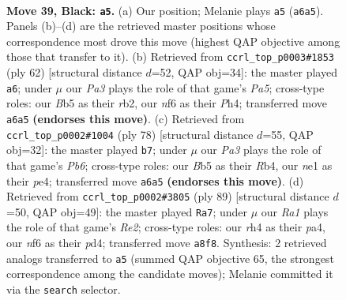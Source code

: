 \documentclass[11pt]{article}
\begin{document}
\clearpage

\begin{figure}[p]\centering
\begin{subfigure}{0.46\textwidth}\centering
\resizebox{\linewidth}{!}{%
\newchessgame
\chessboard[
  setfen={r7/1kP2B2/p4N2/1b3p2/7R/4r3/1P4P1/R2KN3 b - - 1 39},
  showmover=false,
  pgfstyle=straightmove, color=movearrow, markmove={a6-a5}
]}
\caption{}
\end{subfigure}\hfill
\begin{subfigure}{0.46\textwidth}\centering
\resizebox{\linewidth}{!}{%
\newchessgame
\chessboard[
  setfen={r5k1/2B2p2/5R2/P3p1Pp/4b2P/8/1r6/R3K3 w Q - 0 32},
  showmover=false,
  pgfstyle=straightmove, color=movearrow, markmove={a5-a6}
]}
\caption{}
\end{subfigure}
\\[4pt]
\begin{subfigure}{0.46\textwidth}\centering
\resizebox{\linewidth}{!}{%
\newchessgame
\chessboard[
  setfen={1r6/2N5/1P6/r3pp2/PR2pn1k/4R3/5P2/5K2 w - - 0 40},
  showmover=false,
  pgfstyle=straightmove, color=movearrow, markmove={b6-b7}
]}
\caption{}
\end{subfigure}\hfill
\begin{subfigure}{0.46\textwidth}\centering
\resizebox{\linewidth}{!}{%
\newchessgame
\chessboard[
  setfen={3r1k2/4rp1p/1p1Nb3/4P3/P2P4/2R5/5RK1/8 b - - 0 45},
  showmover=false,
  pgfstyle=straightmove, color=movearrow, markmove={e7-a7}
]}
\caption{}
\end{subfigure}
\caption{\textbf{Move 39, Black: \texttt{a5}.} (a) Our position; Melanie plays \texttt{a5} (\texttt{a6a5}). Panels (b)--(d) are the retrieved master positions whose correspondence most drove this move (highest QAP objective among those that transfer to it). (b) Retrieved from \texttt{ccrl\_top\_p0003\#1853} (ply 62) [structural distance $d$=52, QAP obj=34]: the master played \texttt{a6}; under $\mu$ our \emph{Pa3} plays the role of that game's \emph{Pa5}; cross-type roles: our \emph{B}b5 as their \emph{r}b2, our \emph{n}f6 as their \emph{P}h4; transferred move \texttt{a6a5} \textbf{(endorses this move)}. (c) Retrieved from \texttt{ccrl\_top\_p0002\#1004} (ply 78) [structural distance $d$=55, QAP obj=32]: the master played \texttt{b7}; under $\mu$ our \emph{Pa3} plays the role of that game's \emph{Pb6}; cross-type roles: our \emph{B}b5 as their \emph{R}b4, our \emph{n}e1 as their \emph{p}e4; transferred move \texttt{a6a5} \textbf{(endorses this move)}. (d) Retrieved from \texttt{ccrl\_top\_p0002\#3805} (ply 89) [structural distance $d$=50, QAP obj=49]: the master played \texttt{Ra7}; under $\mu$ our \emph{Ra1} plays the role of that game's \emph{Re2}; cross-type roles: our \emph{r}h4 as their \emph{p}a4, our \emph{n}f6 as their \emph{p}d4; transferred move \texttt{a8f8}. Synthesis: 2 retrieved analogs transferred to \texttt{a5} (summed QAP objective 65, the strongest correspondence among the candidate moves); Melanie committed it via the \texttt{search} selector.}
\label{fig:thought-m77}
\end{figure}
\end{document}
